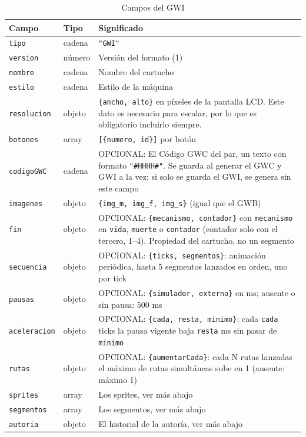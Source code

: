 \begin{table}[H]
	\centering
	\small
	\begin{tabularx}{\textwidth}{@{} l l X @{}}
		\toprule
		\textbf{Campo} & \textbf{Tipo} & \textbf{Significado} \\
		\midrule
		\texttt{tipo} & cadena & \texttt{"GWI"} \\
		\texttt{version} & número & Versión del formato (1) \\
		\texttt{nombre} & cadena & Nombre del cartucho \\
		\texttt{estilo} & cadena & Estilo de la máquina \\
		\texttt{resolucion}\footnotemark\setcounter{fnGWIuno}{\value{footnote}} & objeto & \texttt{\{ancho, alto\}} en píxeles de la pantalla LCD. Este dato es necesario para escalar, por lo que es obligatorio incluirlo siempre.\\
		\texttt{botones} & array & \texttt{[\{numero, id\}]} por botón \\
		\texttt{codigoGWC}\footnotemark\setcounter{fnGWIdos}{\value{footnote}} & cadena & OPCIONAL: El Código GWC del par, un texto con formato \texttt{"\#HHHH\#"}. Se guarda al generar el GWC y GWI a la vez; si solo se guarda el GWI, se genera sin este campo \\
		\texttt{imagenes} & objeto & \texttt{\{img\_m, img\_f, img\_s\}} (igual que el GWB) \\
		\texttt{fin} & objeto & OPCIONAL: \texttt{\{mecanismo, contador\}} con \texttt{mecanismo} en \texttt{vida}, \texttt{muerte} o \texttt{contador} (contador solo con el tercero, 1--4). Propiedad del cartucho, no un segmento \\
		\texttt{secuencia} & objeto & OPCIONAL: \texttt{\{ticks, segmentos\}}: animación periódica, hasta 5 segmentos lanzados en orden, uno por tick \\
		\texttt{pausas} & objeto & OPCIONAL: \texttt{\{simulador, externo\}} en ms; ausente o sin pausa: 500 ms \\
		\texttt{aceleracion} & objeto & OPCIONAL: \texttt{\{cada, resta, minimo\}}: cada \texttt{cada} ticks la pausa vigente baja \texttt{resta} ms sin pasar de \texttt{minimo} \\
		\texttt{rutas} & objeto & OPCIONAL: \texttt{\{aumentarCada\}}: cada N rutas lanzadas el máximo de rutas simultáneas sube en 1 (ausente: máximo 1) \\
		\texttt{sprites} & array & Los sprites, ver más abajo \\
		\texttt{segmentos} & array & Los segmentos, ver más abajo \\
		\texttt{autoria} & objeto & El historial de la autoría, ver más abajo \\
		\bottomrule
	\end{tabularx}
	\caption{Campos del GWI}
	\label{tab:F1A01GWI}
\end{table}

